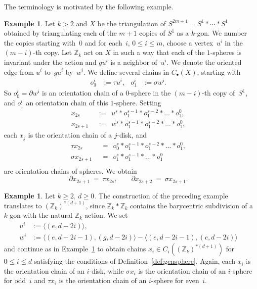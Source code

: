 \documentclass[11pt,a4paper,draft]{article}
\newcommand{\Z}{{\mathbb Z}}
\newcommand{\deq}{:=}
\newcommand\simp[1]{\langle#1\rangle}
\newcommand\join{\ast}
\newcommand{\dd}{\partial}
\theoremstyle{definition}
\newtheorem{example}[theorem]{Example}
\begin{document}
The terminology is motivated by the following example.

\begin{example}\label{ex:Sk}
Let $k>2$ and $X$ be the triangulation of
$S^{2m+1}=S^1\join\cdots\join S^1$ obtained by
triangulating each of the $m+1$ copies of $S^1$ as a $k$-gon.
We number the copies starting with~$0$ and for each~$i$, $0\le i\le m$, 
choose a vertex~$u^i$ in the $(m-i)$-th copy. Let $\Z_k$ act on $X$ in 
such a way that each of the $1$-spheres is invariant under the action
and $gu^i$ is a neighbor of~$u^i$.  We denote the oriented edge from
$u^i$ to~$gu^i$ by~$w^i$.  We define several chains in $C_\bullet(X)$,
starting with
\begin{align*}
o_0^i&\deq\tau u^i,&o_1^i&\deq\sigma w^i.
\end{align*}
So $o^i_0=\dd w^i$ is an orientation chain of a $0$-sphere in the
$(m-i)$-th copy of~$S^1$, and $o^i_1$ an orientation chain of
this $1$-sphere.  Setting
\begin{align*}
x_{2s}&\ \ \deq\ \  u^s\join o_1^{s-1}\join o_1^{s-2}\join\dots\join o_1^0,\\
x_{2s+1}&\ \ \deq\ \ w^s\join o_1^{s-1}\join o_1^{s-2}\join\dots\join o_1^0,
\end{align*}
each $x_j$ is the orientation chain of a $j$-disk, and
\begin{align*}
\tau x_{2s}&\ \ =\ \ o_0^s\join o_1^{s-1}\join o_1^{s-2}\join\dots\join o_1^0,\\
\sigma x_{2s+1}&\ \ =\ \ o_1^s\join o_1^{s-1}\join\dots\join o_1^0\\
\end{align*}
are orientation chains of spheres.  We obtain
\[
\dd x_{2s+1}\ =\ \tau x_{2s},\qquad
\dd x_{2s+2}\ =\ \sigma x_{2s+1}.
\]
\end{example}

\begin{example} \label{ex:EZk}
Let $k\ge2$, $d\ge0$.  The construction of the preceding example
translates to $(\Z_k)^{*(d+1)}$, since $\Z_k\join\Z_k$ contains the
barycentric subdivision of a $k$-gon with the natural $\Z_k$-action.
We set
\begin{align*}
u^i&\deq\simp{(e,d-2i)},\\
w^i&\deq\simp{(e,d-2i-1),(g,d-2i)}-\simp{(e,d-2i-1),(e,d-2i)}
\end{align*}
and continue as in Example~\ref{ex:Sk} to obtain
chains $x_i\in C_i((\Z_k)^{*(d+1)})$ for $0\le
i\le d$ satisfying the conditions of Definition~\ref{def:gensphere}.
Again, each $x_i$ is the orientation chain of an $i$-disk, while
$\sigma x_i$ is the orientation chain of an $i$-sphere for odd~$i$ and
$\tau x_i$ is the orientation chain of an $i$-sphere for even~$i$.
\end{example}
\end{document}
